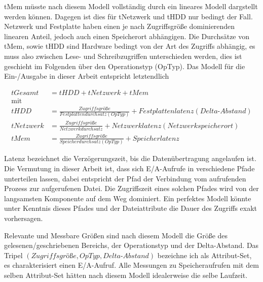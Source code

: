\documentclass[
	12pt,
	a4paper,
	BCOR10mm,
	DIV14,
	listof=totoc,
	bibliography=totoc,
	headsepline
]{scrreprt}
\begin{document}
tMem müsste nach diesem Modell vollständig durch ein lineares Modell dargstellt werden können. Dagegen ist dies für tNetzwerk und tHDD nur bedingt der Fall.
Netzwerk und Festplatte haben einen je nach Zugriffsgröße dominierenden linearen Anteil, jedoch auch einen Speicherort abhängigen.
Die Durchsätze von tMem, sowie tHDD sind Hardware bedingt von der Art des Zugriffs abhängig, es muss also zwischen Lese- und Schreibzugriffen unterschieden werden, dies ist geschieht im Folgenden über den Operationstyp (OpTyp).
Das Modell für die Ein-/Ausgabe in dieser Arbeit entspricht letztendlich

\begin{align*}
tGesamt &= tHDD + tNetzwerk + tMem\\
\text{mit}\\
tHDD &= \frac{Zugriffsgrö\text{ß}e}{Festplattendurchsatz(OpTyp)} + Festplattenlatenz(Delta\text{-}Abstand) \\
tNetzwerk &= \frac{Zugriffsgrö\text{ß}e}{Netzwerkdurchsatz} + Netzwerklatenz(Netzwerkspeicherort) \\
tMem &= \frac{Zugriffsgrö\text{ß}e}{Speicherdurchsatz(OpTyp)} + Speicherlatenz
\end{align*}

Latenz bezeichnet die Verzögerungszeit, bis die Datenübertragung angelaufen ist.
Die Vermutung in dieser Arbeit ist, dass sich E/A-Aufrufe in verschiedene Pfade unterteilen lassen, dabei entspricht der Pfad der Verbindung vom aufrufenden Prozess zur aufgerufenen Datei. Die Zugriffszeit eines solchen Pfades wird von der langsamsten Komponente auf dem Weg dominiert. 
Ein perfektes Modell könnte unter Kenntnis dieses Pfades und der Dateiattribute die Dauer des Zugriffs exakt vorhersagen.

Relevante und Messbare Größen sind nach diesem Modell die Größe des gelesenen/geschriebenen Bereichs, der Operationstyp und der Delta-Abstand. 
Das Tripel $(Zugriffsgrö\text{ß}e,OpTyp,Delta\text{-}Abstand)$ bezeichne ich als Attribut-Set, es charakterisiert einen E/A-Aufruf. Alle Messungen zu Speicheraufrufen mit dem selben Attribut-Set hätten nach diesem Modell idealerweise die selbe Laufzeit. 
\end{document}
